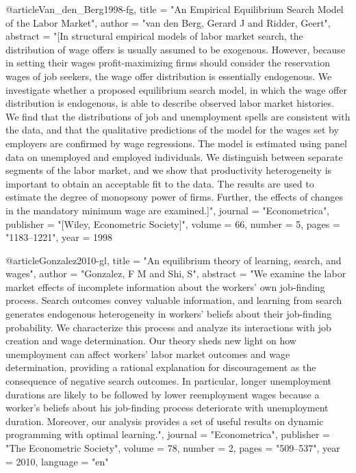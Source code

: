 {@article{Van_den_Berg1998-fg,
	title     = "An Empirical Equilibrium Search Model of the Labor Market",
	author    = "van den Berg, Gerard J and Ridder, Geert",
	abstract  = "[In structural empirical models of labor market search, the
	distribution of wage offers is usually assumed to be exogenous.
	However, because in setting their wages profit-maximizing firms
	should consider the reservation wages of job seekers, the wage
	offer distribution is essentially endogenous. We investigate
	whether a proposed equilibrium search model, in which the wage
	offer distribution is endogenous, is able to describe observed
	labor market histories. We find that the distributions of job
	and unemployment spells are consistent with the data, and that
	the qualitative predictions of the model for the wages set by
	employers are confirmed by wage regressions. The model is
	estimated using panel data on unemployed and employed
	individuals. We distinguish between separate segments of the
	labor market, and we show that productivity heterogeneity is
	important to obtain an acceptable fit to the data. The results
	are used to estimate the degree of monopsony power of firms.
	Further, the effects of changes in the mandatory minimum wage
	are examined.]",
	journal   = "Econometrica",
	publisher = "[Wiley, Econometric Society]",
	volume    =  66,
	number    =  5,
	pages     = "1183--1221",
	year      =  1998
}

@article{Gonzalez2010-gl,
	title     = "An equilibrium theory of learning, search, and wages",
	author    = "Gonzalez, F M and Shi, S",
	abstract  = "We examine the labor market effects of incomplete information
	about the workers' own job-finding process. Search outcomes
	convey valuable information, and learning from search generates
	endogenous heterogeneity in workers' beliefs about their
	job-finding probability. We characterize this process and
	analyze its interactions with job creation and wage
	determination. Our theory sheds new light on how unemployment
	can affect workers' labor market outcomes and wage
	determination, providing a rational explanation for
	discouragement as the consequence of negative search outcomes.
	In particular, longer unemployment durations are likely to be
	followed by lower reemployment wages because a worker's beliefs
	about his job-finding process deteriorate with unemployment
	duration. Moreover, our analysis provides a set of useful
	results on dynamic programming with optimal learning.",
	journal   = "Econometrica",
	publisher = "The Econometric Society",
	volume    =  78,
	number    =  2,
	pages     = "509--537",
	year      =  2010,
	language  = "en"
}

}

